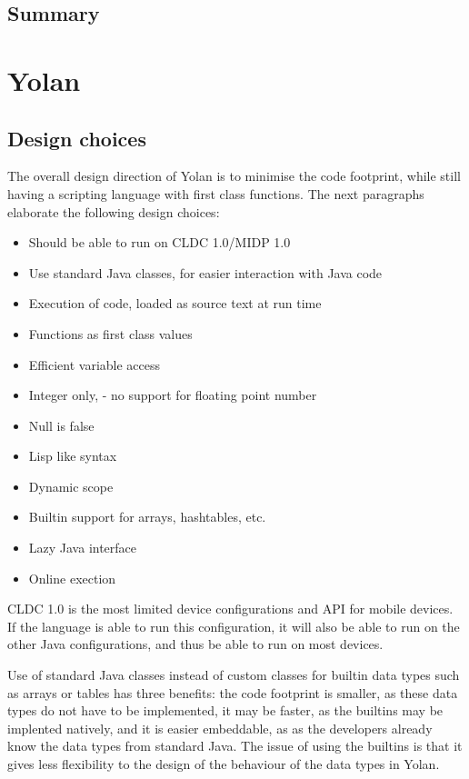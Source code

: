 \documentclass[11pt]{report}
\begin{document}
\section{Summary}
\chapter{Yolan}
\label{yolan}
\section{Design choices}
The overall design direction of Yolan is to minimise the code footprint, while still having a scripting language with first class functions.
The next paragraphs elaborate the following design choices:
\begin{itemize}
\item Should be able to run on CLDC 1.0/MIDP 1.0
\item Use standard Java classes, for easier interaction with Java code
\item Execution of code, loaded as source text at run time
\item Functions as first class values
\item Efficient variable access
\item Integer only, - no support for floating point number
\item Null is false
\item Lisp like syntax
\item Dynamic scope
\item Builtin support for arrays, hashtables, etc.
\item Lazy Java interface
\item Online exection
\end{itemize}

CLDC 1.0 is the most limited device configurations and API for mobile devices. If the language is able to run this configuration, it will also be able to run on the other Java configurations, and thus be able to run on most devices.

\label{yolandesign}
Use of standard Java classes instead of custom classes for builtin data types such as arrays or tables has three benefits: the code footprint is smaller, as these data types do not have to be implemented, it may be faster, as the builtins may be implented natively, and it is easier embeddable, as as the developers already know the data types from standard Java.
The issue of using the builtins is that it gives less flexibility to the design of the behaviour of the data types in Yolan.
\end{document}
